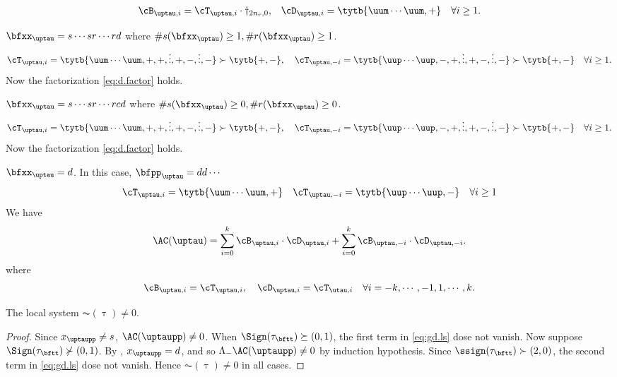 \documentclass[ssunip]{subfiles}
\begin{document}
{\begin{enumT}
\begin{align*}
        \cB_{\uptau,i} &= \cT_{\uptau,i}\cdot \dagger_{2n_{r},0},  &
        \cD_{\uptau,i} &= \tytb{\uum\cdots\uum,+}  \quad \forall i\geq  1.\\
      \end{align*}
    \item $\bfxx_{\uptau} = s\cdots sr\cdots rd$ where
    $\#s(\bfxx_{\uptau})\geq 1, \#r(\bfxx_{\uptau})\geq 1$.
    \[
      \cT_{\uptau,i} = \tytb{\uum\cdots\uum,+,+,\vdots,+,-,\vdots,-} \succ\tytb{+,-},
      \quad \cT_{\uptau,-i} = \tytb{\uup\cdots\uup,-,+,\vdots,+,-,\vdots,-} \succ\tytb{+,-}
      \quad \forall i\geq 1.
    \]
    Now the factorization \eqref{eq:d.factor} holds.
    \item $\bfxx_{\uptau} = s\cdots sr\cdots rcd$ where
    $\#s(\bfxx_{\uptau})\geq 0, \#r(\bfxx_{\uptau})\geq 0$.
    \[
      \cT_{\uptau,i} = \tytb{\uum\cdots\uum,+,+,\vdots,+,-,\vdots,-}\succ\tytb{+,-},
      \quad \cT_{\uptau,-i} = \tytb{\uup\cdots\uup,-,+,\vdots,+,-,\vdots,-}\succ\tytb{+,-}
      \quad \forall i\geq 1.
    \]
    Now the factorization \eqref{eq:d.factor} holds.
    \item $\bfxx_{\uptau}=d$. In this case, $\bfpp_{\uptau} = dd\cdots$
    \[
      \cT_{\uptau,i} = \tytb{\uum\cdots\uum,+} \quad \cT_{\uptau,-i} = \tytb{\uup\cdots\uup,-}
      \quad \forall i \geq 1
    \]
    We have
    \[
      \oAC{\uptau} = \sum_{i=0}^{k}\cB_{\uptau,i}\cdot \cD_{\uptau,i}+\sum_{i=0}^{k}\cB_{\uptau,-i}\cdot \cD_{\uptau,-i}.
    \]
    where
    \[
        \cB_{\uptau,i} = \cT_{\uptau,i}, \quad
        \cD_{\uptau,i} = \cT_{\utau,i}  \quad \forall i = -k, \cdots, -1,1,\cdots, k.\\
    \]
  \end{enumT}
}

\begin{lem}
  The local system $\AC(\uptau)\neq 0$.
\end{lem}
\begin{proof}
  Since $x_{\uptaupp}\neq s$, $\AC(\uptaupp)\neq 0$. When
  $\Sign(\tau_{\bftt})\succeq (0,1)$, the first term in \eqref{eq:gd.ls} dose
  not vanish. Now suppose $\Sign(\tau_{\bftt})\nsucc(0,1)$. By ,
  $x_{\uptaupp}=d$, and so $\Lambda_{-}\AC(\uptaupp)\neq 0$ by induction
  hypothesis.
  Since $\ssign(\tau_{\bftt})\succ(2,0)$, the second term in \eqref{eq:gd.ls}
  dose not vanish.
  Hence $\AC( \uptau )\neq 0$ in all
  cases.
\end{proof}
\end{document}
